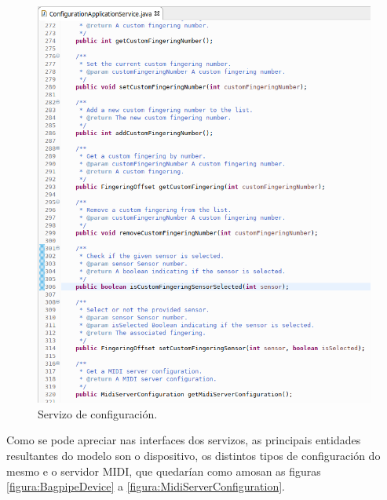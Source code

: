    \begin{figure}[htbp]
    \centering
    \includegraphics[scale=0.6, keepaspectratio=true]{./imagenes/servizo-configuracion-7.png}
    \caption{Servizo de configuración.}
    \label{figura:ServizoConfiguracion7}
   \end{figure}
   
   Como se pode apreciar nas interfaces dos servizos, as principais entidades
   resultantes do modelo son o dispositivo, os distintos tipos de configuración
   do mesmo e o servidor MIDI, que quedarían como amosan as figuras 
   \ref{figura:BagpipeDevice} a \ref{figura:MidiServerConfiguration}. \\
   

